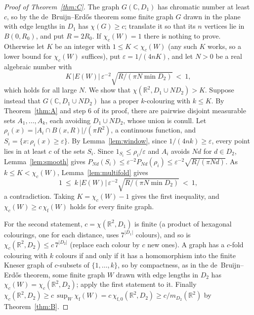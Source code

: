 \documentclass[11pt,a4paper]{amsart}
\theoremstyle{definition}
\theoremstyle{remark}
\newcommand{\C}{\mathbb{C}}
\newcommand{\R}{\mathbb{R}}
\newcommand{\chif}{\chi_{\mathrm f}}
\begin{document}
\begin{proof}[Proof of Theorem~\ref{thm:C}]
The graph $G(\C,D_1)$ has chromatic number at least $c$, so by the de~Bruijn--Erd\H{o}s theorem \cite{dBE} some
finite graph $G$ drawn in the plane with edge lengths in $D_1$ has $\chi(G)\ge c$; translate it so that its $n$
vertices lie in $B(0,R_0)$, and put $R=2R_0$. If $\chi_c(W)=1$ there is nothing to prove. Otherwise let $K$ be an
integer with $1\le K<\chi_c(W)$ (any such $K$ works, so a lower bound for $\chi_c(W)$ suffices), put
$\varepsilon=1/(4nK)$, and let $N>0$ be a real algebraic number with
\[
K\,|E(W)|\,\varepsilon^{-2}\sqrt{R/(\pi N\min D_2)}\ <\ 1 ,
\]
which holds for all large $N$. We show that $\chi(\R^2,D_1\cup ND_2)>K$. Suppose instead that $G(\C,D_1\cup ND_2)$
has a proper $k$-colouring with $k\le K$. By Theorem~\ref{thm:A} and step 6 of its proof, there are pairwise disjoint
measurable sets $A_1,\dots,A_k$, each avoiding $D_1\cup ND_2$, whose union is conull. Let
$\rho_i(x)=|A_i\cap B(x,R)|/(\pi R^2)$, a continuous function, and $S_i=\{x:\rho_i(x)\ge\varepsilon\}$. By
Lemma~\ref{lem:window}, since $1/(4nk)\ge\varepsilon$, every point lies in at least $c$ of the sets $S_i$. Since
$1_{S_i}\le\rho_i/\varepsilon$ and $A_i$ avoids $Nd$ for $d\in D_2$, Lemma~\ref{lem:smooth} gives
$P_{Nd}(S_i)\le\varepsilon^{-2}P_{Nd}(\rho_i)\le\varepsilon^{-2}\sqrt{R/(\pi Nd)}$. As $k\le K<\chi_c(W)$,
Lemma~\ref{lem:multifold} gives
\[
1\ \le\ k\,|E(W)|\,\varepsilon^{-2}\sqrt{R/(\pi N\min D_2)}\ <\ 1,
\]
a contradiction. Taking $K=\chi_c(W)-1$ gives the first inequality, and $\chi_c(W)\ge c\,\chif(W)$ holds for every
finite graph.

For the second statement, $c=\chi(\R^2,D_1)$ is finite (a product of hexagonal colourings, one for each distance,
uses $7^{|D_1|}$ colours), and so is $\chi_c(\R^2,D_2)\le c\,7^{|D_2|}$ (replace each colour by $c$ new ones). A graph
has a $c$-fold colouring with $k$ colours if and only if it has a homomorphism into the finite Kneser graph of
$c$-subsets of $\{1,\dots,k\}$, so by compactness, as in the de~Bruijn--Erd\H{o}s theorem, some finite graph $W$ drawn
with edge lengths in $D_2$ has $\chi_c(W)=\chi_c(\R^2,D_2)$; apply the first statement to it. Finally
$\chi_c(\R^2,D_2)\ge c\,\sup_W\chif(W)=c\,\chi_{\mathrm f,0}(\R^2,D_2)\ge c/m_{D_2}(\R^2)$ by Theorem~\ref{thm:B}.
\end{proof}
\end{document}
